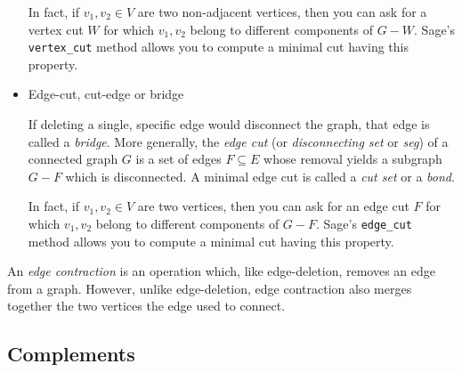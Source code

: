 \begin{itemize}
In fact, if $v_1, v_2 \in V$ are two non-adjacent vertices, then you
can ask for a vertex cut $W$ for which $v_1, v_2$ belong to different
components of $G - W$. Sage's \verb!vertex_cut! method allows you to
compute a minimal cut having this property.

\item Edge-cut, cut-edge or bridge

If deleting a single, specific edge would disconnect the graph, that
edge is called a \emph{bridge}. More generally, the \emph{edge cut}
(or \emph{disconnecting set} or {\it seg}) of a connected graph $G$ is a set of
edges $F \subseteq E$ whose removal yields a subgraph $G - F$ which is
disconnected. A minimal edge cut is called a {\it cut set} or a {\it bond}.

In fact, if $v_1, v_2 \in V$ are two vertices, then you can ask for an
edge cut $F$ for which $v_1, v_2$ belong to different components of
$G - F$. Sage's \verb!edge_cut! method allows you to compute a minimal
cut having this property.
\end{itemize}

An {\it edge contraction} is an operation which, like edge-deletion,
removes an edge from a graph. However, unlike edge-deletion,
edge contraction also merges together the two vertices the edge
used to connect.


\subsection{Complements}

